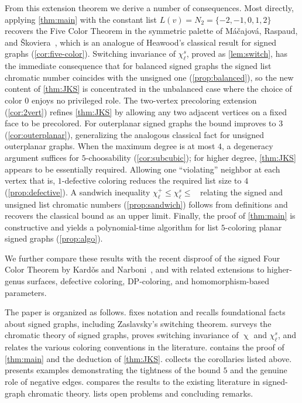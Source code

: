 \documentclass[11pt,a4paper]{article}
\theoremstyle{plain}
\theoremstyle{definition}
\DeclareMathOperator{\chia}{\chi}
\DeclareMathOperator{\chil}{\chi_\ell}
\newcommand{\chs}{\chi_{\ell}^{s}}
\newcommand{\Ns}[1]{N_{#1}}
\begin{document}
From this extension theorem we derive a number of consequences.
Most directly, applying \cref{thm:main} with the constant list
$L(v)=\Ns{2}=\{-2,-1,0,1,2\}$ recovers the Five Color Theorem in
the symmetric palette of M\'a\v{c}ajov\'a, Raspaud, and
\v{S}koviera~\cite{MRS2016}, which is an analogue of Heawood's
classical result for signed graphs (\cref{cor:five-color}).
Switching invariance of $\chs$, proved as \cref{lem:switch}, has
the immediate consequence that for balanced signed graphs the
signed list chromatic number coincides with the unsigned one
(\cref{prop:balanced}), so the new content of \cref{thm:JKS} is
concentrated in the unbalanced case where the choice of color $0$
enjoys no privileged role. The two-vertex precoloring extension
(\cref{cor:2vert}) refines \cref{thm:JKS} by allowing any two
adjacent vertices on a fixed face to be precolored. For outerplanar
signed graphs the bound improves to $3$ (\cref{cor:outerplanar}),
generalizing the analogous classical fact for unsigned outerplanar
graphs. When the maximum degree is at most $4$, a degeneracy
argument suffices for $5$-choosability (\cref{cor:subcubic}); for
higher degree, \cref{thm:JKS} appears to be essentially required.
Allowing one ``violating'' neighbor at each vertex  that is,
$1$-defective coloring  reduces the required list size to $4$
(\cref{prop:defective}). A sandwich inequality
$\chi_\ell^+\le\chs\le\chil$ relating the signed and unsigned list
chromatic numbers (\cref{prop:sandwich}) follows from definitions
and recovers the classical bound as an upper limit. Finally, the
proof of \cref{thm:main} is constructive and yields a
polynomial-time algorithm for list $5$-coloring planar signed
graphs (\cref{prop:algo}).

We further compare these results with the recent disproof of the
signed Four Color Theorem by Kard\v{o}s and
Narboni~\cite{KardosNarboni2021}, and with related extensions to
higher-genus surfaces, defective coloring, DP-coloring, and
homomorphism-based parameters.

The paper is organized as follows.
 fixes notation and recalls foundational
facts about signed graphs, including Zaslavsky's switching theorem.
 surveys the chromatic theory of signed graphs,
proves switching invariance of $\chia$ and $\chs$, and relates the
various coloring conventions in the literature.
 contains the proof of \cref{thm:main} and the
deduction of \cref{thm:JKS}.  collects the corollaries
listed above.  presents examples demonstrating
the tightness of the bound $5$ and the genuine role of negative
edges.  compares the results to the existing
literature in signed-graph chromatic theory.  lists
open problems and concluding remarks.
\end{document}
